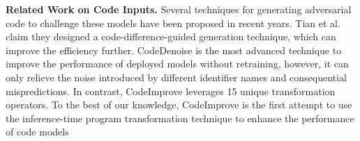 
\textbf{Related Work on Code Inputs.} 
Several techniques\cite{zhang2020generating,yefet2020adversarial, naturalattack, carrot,srikant2021generating} for generating adversarial code to challenge these models have been proposed in recent years. Tian et al.\cite{tian2023code} claim they designed a code-difference-guided generation technique, which can improve the efficiency further. CodeDenoise\cite{tian2023fly} is the most advanced technique to improve the performance of deployed models without retraining, however, it can only relieve the noise introduced by different identifier names and consequential mispredictions. In contrast, CodeImprove leverages 15 unique transformation operators. To the best of our knowledge, CodeImprove is the first attempt to use the inference-time program transformation technique to enhance the performance of code models 

